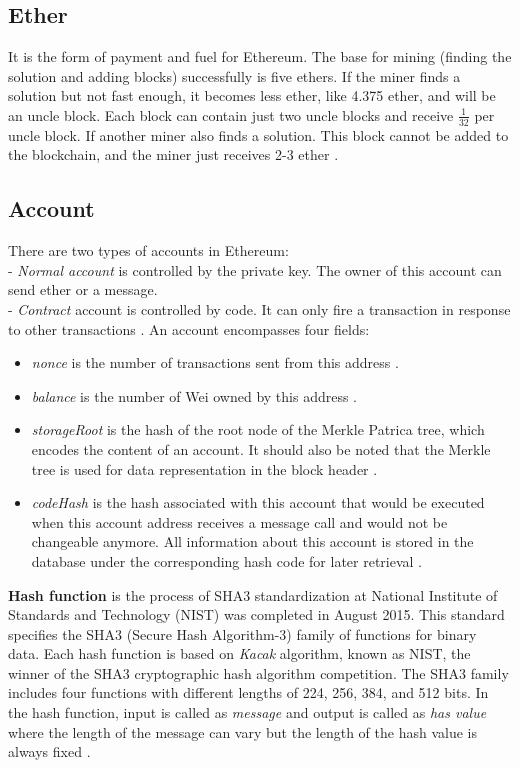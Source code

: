 \subsection{Ether}
It is the form of payment and fuel for Ethereum. The base for mining (finding the solution and adding blocks) successfully is five ethers. If the miner finds a solution but not fast enough, it becomes less ether, like 4.375 ether, and will be an uncle block. Each block can contain just two uncle blocks and receive $\frac{1}{32}$ per uncle block. If another miner also finds a solution. This block cannot be added to the blockchain, and the miner just receives 2-3 ether \cite{Egbertsen}.
\subsection{Account}
There are two types of accounts in Ethereum:\\
- \textit{Normal account} is controlled by the private key. The owner of this account can send ether or a message.\\
- \textit{Contract} account is controlled by code. It can only fire a transaction in response to other transactions \cite{Egbertsen}. An account encompasses four fields:\\
 \begin{itemize}
     \item \textit{nonce} is the number of transactions sent from this address \cite{Gavin}.
     \item \textit{balance} is the number of Wei owned by this address \cite{Gavin}.
     \item \textit{storageRoot} is the hash of the root node of the Merkle Patrica tree, which encodes the content of an account. It should also be noted that the Merkle tree is used for data representation in the block header \cite{Gavin}.
     \item \textit{codeHash}
     is the hash associated with this account that would be executed when this account address receives a message call and would not be changeable anymore. All information about this account is stored in the database under the corresponding hash code for later retrieval \cite{Gavin}. \\
    
\end{itemize}
\textbf{Hash function}
is the process of SHA3 standardization at National Institute of Standards and Technology (NIST) was completed in August 2015.
This standard specifies the SHA3 (Secure Hash Algorithm-3) family of functions for binary data. Each hash function is based on \textit{Kacak} algorithm, known as NIST, the winner of the SHA3 cryptographic hash algorithm competition. The SHA3 family includes four functions with different lengths of 224, 256, 384, and 512 bits.
In the hash function, input is called as \textit{message} and output is called as \textit{has value} where the length of the message can vary but the length of the hash value is always fixed \cite{Dworkin}.\\


